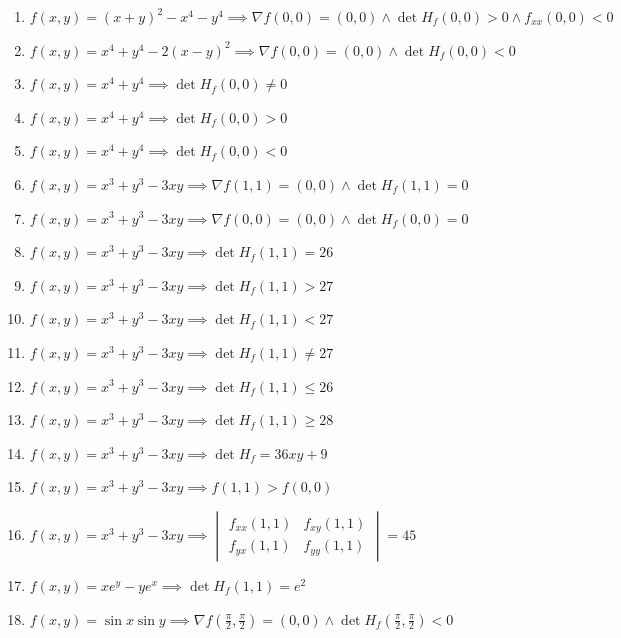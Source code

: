 \documentclass[11pt,a4paper]{article}
\begin{document}
\begin{enumerate}
\item $\displaystyle f(x, y) = (x + y)^{2} - x^{4} - y^{4} \implies \nabla f(0, 0) = (0, 0) \land \det H_{f}(0, 0) > 0 \land f_{xx}(0, 0) < 0$
\item $\displaystyle f(x, y) = x^{4} + y^{4} - 2(x - y)^{2} \implies \nabla f(0, 0) = (0, 0) \land \det H_{f}(0, 0) < 0$
\item $\displaystyle f(x, y) = x^{4} + y^{4} \implies \det H_{f}(0, 0) \neq 0$
\item $\displaystyle f(x, y) = x^{4} + y^{4} \implies \det H_{f}(0, 0) > 0$
\item $\displaystyle f(x, y) = x^{4} + y^{4} \implies \det H_{f}(0, 0) < 0$
\item $\displaystyle f(x, y) = x^{3} + y^{3} - 3xy \implies \nabla f(1, 1) = (0, 0) \land \det H_{f}(1, 1) = 0$
\item $\displaystyle f(x, y) = x^{3} + y^{3} - 3xy \implies \nabla f(0, 0) = (0, 0) \land \det H_{f}(0, 0) = 0$
\item $\displaystyle f(x, y) = x^{3} + y^{3} - 3xy \implies \det H_{f}(1, 1) = 26$
\item $\displaystyle f(x, y) = x^{3} + y^{3} - 3xy \implies \det H_{f}(1, 1) > 27$
\item $\displaystyle f(x, y) = x^{3} + y^{3} - 3xy \implies \det H_{f}(1, 1) < 27$
\item $\displaystyle f(x, y) = x^{3} + y^{3} - 3xy \implies \det H_{f}(1, 1) \neq 27$
\item $\displaystyle f(x, y) = x^{3} + y^{3} - 3xy \implies \det H_{f}(1, 1) \le 26$
\item $\displaystyle f(x, y) = x^{3} + y^{3} - 3xy \implies \det H_{f}(1, 1) \ge 28$
\item $\displaystyle f(x, y) = x^{3} + y^{3} - 3xy \implies \det H_{f} = 36xy + 9$
\item $\displaystyle f(x, y) = x^{3} + y^{3} - 3xy \implies f(1, 1) > f(0, 0)$
\item $\displaystyle f(x, y) = x^{3} + y^{3} - 3xy \implies \begin{vmatrix} f_{xx}(1, 1) & f_{xy}(1, 1) \\ f_{yx}(1, 1) & f_{yy}(1, 1) \end{vmatrix} = 45$
\item $\displaystyle f(x, y) = x e^{y} - y e^{x} \implies \det H_{f}(1, 1) = e^{2}$
\item $\displaystyle f(x, y) = \sin x \sin y \implies \nabla f\left( \frac{\pi}{2}, \frac{\pi}{2} \right) = (0, 0) \land \det H_{f}\left( \frac{\pi}{2}, \frac{\pi}{2} \right) < 0$

\end{enumerate}
\end{document}
